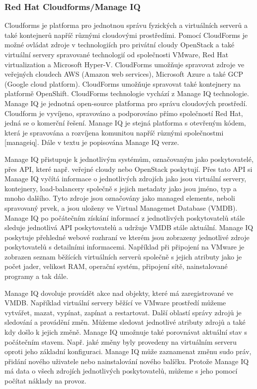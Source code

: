 \subsubsection{Red Hat Cloudforms/Manage IQ}
Cloudforms je platforma pro jednotnou správu fyzických a virtuálních serverů a také kontejnerů napříč různými cloudovými prostředími. Pomocí CloudForms je možné ovládat zdroje v technologiích pro privátní cloudy OpenStack a také virtuální servery spravované technologií od společnosti VMware, Red Hat virtualization a Microsoft Hyper-V. CloudForms umožňuje spravovat zdroje ve veřejných cloudech AWS (Amazon web services), Microsoft Azure a také GCP (Google cloud platform). CloudForms umožňuje spravovat také kontejnery na platformě OpenShift. CloudForms technologie vychází z Manage IQ technologie. Manage IQ je jednotná open-source platforma pro správu cloudových prostředí. Cloudform je vyvíjeno, spravováno a podporováno přímo společností Red Hat, jedná se o komerční řešení. Manage IQ je stejná platforma s otevřeným kódem, která je spravována a rozvíjena komunitou napříč různými společnostmi [manageiq]. Dále v textu je popisována Manage IQ verze.\par
    Manage IQ přistupuje k jednotlivým systémům, označovaným jako poskytovatelé, přes API, které např. veřejné cloudy nebo OpenStack poskytují. Přes tato API si Manage IQ vyčítá informace o jednotlivých zdrojích  jako jsou virtuální servery, kontejnery, load-balancery společně s jejich metadaty jako jsou jméno, typ a mnoho dalšího. Tyto zdroje jsou označovány jako managed elements, neboli spravovaný prvek, a jsou uloženy ve Virtual Managemet Database (VMDB). Manage IQ po počátečním získání informací z jednotlivých poskytovatelů stále sleduje jednotlivá API poskytovatelů a udržuje VMDB stále aktuální. Manage IQ poskytuje přehledné webové rozhraní ve kterém jsou zobrazeny jednotlivé zdroje poskytovatelů s detailními informacemi. Například při připojení na VMware je zobrazen seznam běžících virtuálních serverů společně s jejich atributy jako je počet jader, velikost RAM, operační systém, připojení sítě, nainstalované programy a tak dále. \par
    Manage IQ dovoluje provádět akce nad objekty, které má zaregistrované ve VMDB. Například virtuální servery běžící ve VMware prostředí můžeme vytvářet, mazat, vypínat, zapínat a restartovat. Další oblastí správy zdrojů je sledování a provádění změn. Můžeme sledovat jednotlivé atributy zdrojů a také kdy došlo k jejich změně. Manage IQ umožnuje také porovnávat aktuální stav s počátečním stavem. Např. jaké změny byly provedeny na virtuálním serveru oproti jeho základní konfiguraci. Manage IQ může zaznamenat změnu sudo práv, přidání nového uživatele nebo nainstalování nového balíčku. Protože Manage IQ má data o všech zdrojích jednotlivých poskytovatelů, můžeme s jeho pomocí počítat náklady na provoz.\par
